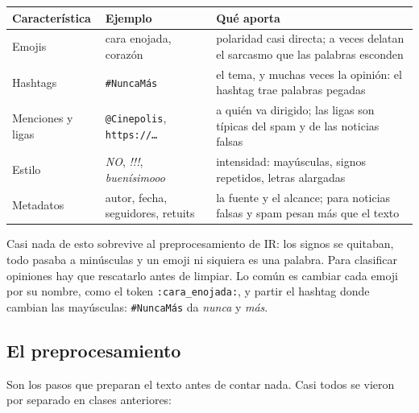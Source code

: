 \documentclass[11pt,letterpaper]{article}
\begin{document}
\begin{center}
\small
\begin{tabular}{>{\raggedright\arraybackslash}p{3.1cm}%
                >{\raggedright\arraybackslash}p{3.3cm}%
                >{\raggedright\arraybackslash}p{7.2cm}}
    \toprule
    \textbf{Característica} & \textbf{Ejemplo} & \textbf{Qué aporta} \\
    \midrule
    Emojis & cara enojada, corazón
        & polaridad casi directa; a veces delatan el sarcasmo que las
          palabras esconden \\
    \addlinespace
    Hashtags & \texttt{\#NuncaMás}
        & el tema, y muchas veces la opinión: el hashtag trae palabras
          pegadas \\
    \addlinespace
    Menciones y ligas & \texttt{@Cinepolis}, \texttt{https://\dots}
        & a quién va dirigido; las ligas son típicas del spam y de las
          noticias falsas \\
    \addlinespace
    Estilo & \textit{NO}, \textit{!!!}, \textit{buenísimooo}
        & intensidad: mayúsculas, signos repetidos, letras
          alargadas \\
    \addlinespace
    Metadatos & autor, fecha, seguidores, retuits
        & la fuente y el alcance; para noticias falsas y spam pesan
          más que el texto \\
    \bottomrule
\end{tabular}
\end{center}

Casi nada de esto sobrevive al preprocesamiento de IR: los signos se
quitaban, todo pasaba a minúsculas y un emoji ni siquiera es una
palabra. Para clasificar opiniones hay que rescatarlo antes de
limpiar. Lo común es cambiar cada emoji por su nombre, como el token
\texttt{:cara\_enojada:}, y partir el hashtag donde cambian las
mayúsculas: \texttt{\#NuncaMás} da \textit{nunca} y \textit{más}.


\subsection*{El preprocesamiento}

Son los pasos que preparan el texto antes de contar nada. Casi todos
se vieron por separado en clases anteriores:
\end{document}
